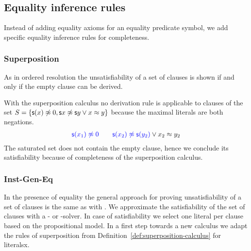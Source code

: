 \subsection{Equality inference rules}

Instead of adding equality axioms for an equality predicate symbol,
we add specific equality inference rules for completeness.


\subsubsection{Superposition}\label{sec:superposition}

As in ordered resolution the unsatisfiability of a set of clauses is shown
if and only if the empty clause can be derived.




\begin{example} With the superposition calculus no derivation rule is applicable
	to clauses of the set \( S = \{ \mathsf{s}(x)\not\approx 0, \mathsf{s}{x}\not\approx\mathsf{s}{y} \lor x\approx y \} \)
	because the maximal literals are both negations.
	\begin{align*}
	{\colN \msucc(x_1) \mNE 0}\qquad{\colN \msucc(x_2) \mNE \msucc(y_2)} \lor x_2\mEQ y_2
	\end{align*}
	The saturated set does not contain the empty clause, hence we conclude its satisfiability because of completeness of the superposition calculus.
\end{example}

\subsubsection{Inst-Gen-Eq}\label{sec:inst:gen:eq}

In the presence of equality the general approach
for proving unsatisfiability of a set of clauses
is the same as with \InstGen{}.
We approximate the satisfiability of the set of clauses with a \SAT{}- or \SMT{}-solver.
In case of satisfiability we select one literal per clause based on the propositional model.
In a first step towards a new calculus we adapt the rules of superposition from 
Definition~\vref{def:superposition-calculus} for literalsx.



